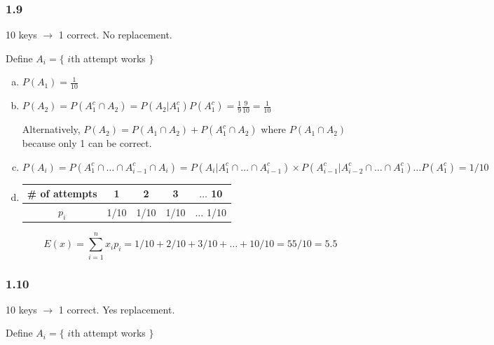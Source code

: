 \documentclass{report}
\begin{document}
\subsubsection*{1.9}

10 keys $\rightarrow$ 1 correct. No replacement.

Define $A_i = \{ $ $i$th attempt works $\}$

\begin{enumerate}[(a)]
\item $P(A_1) = \frac{1}{10}$
\item $P(A_2) = P(A_1^c \cap A_2) = P(A_2|A_1^c) P(A_1^c) = \frac{1}{9} \frac{9}{10} = \frac{1}{10}$

Alternatively, $P(A_2) = P(A_1 \cap A_2) + P(A_1^c \cap A_2)$ where $P(A_1 \cap A_2)$ because only 1 can be correct.

\item $P(A_i) = P(A_1^c \cap \dots \cap A_{i-1}^c \cap A_i) = P(A_i | A_1^c \cap \dots \cap A_{i-1}^c) \times P(A_{i-1}^c | A_{i-2}^c \cap \dots \cap A_{1}^c) \dots P(A_1^c) = 1/10$

\item 

\begin{table}[H]
\centering
\begin{tabular}{c|cccc}
\toprule
\# of attempts & 1 & 2 & 3 & $\dots$ 10 \\
\midrule
$p_i$ & 1/10 & 1/10 & 1/10 & $\dots$ 1/10 \\
\bottomrule
\end{tabular}
\end{table}

$$
E(x) = \sum_{i=1}^n x_i p_i = 1/10 + 2/10 + 3/10 + \dots + 10/10 = 55/10 = 5.5
$$



\end{enumerate}

\subsubsection*{1.10}


10 keys $\rightarrow$ 1 correct. Yes replacement.

Define $A_i = \{ $ $i$th attempt works $\}$
\end{document}
